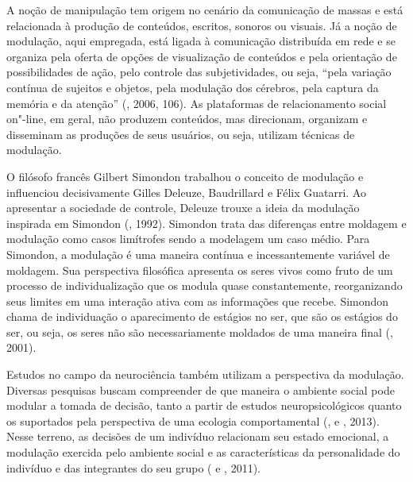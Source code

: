 A noção de manipulação tem origem no cenário da comunicação de massas e
está relacionada à produção de conteúdos, escritos, sonoros ou visuais.
Já a noção de modulação, aqui empregada, está ligada à comunicação
distribuída em rede e se organiza pela oferta de opções de visualização
de conteúdos e pela orientação de possibilidades de ação, pelo controle
das subjetividades, ou seja, ``pela variação contínua de sujeitos e
objetos, pela modulação dos cérebros, pela captura da memória e da
atenção'' (, 2006, 106). As plataformas de relacionamento
social on"-line, em geral, não produzem conteúdos, mas direcionam,
organizam e disseminam as produções de seus usuários, ou seja, utilizam
técnicas de modulação.

O filósofo francês Gilbert Simondon trabalhou o conceito de modulação e
influenciou decisivamente Gilles Deleuze, Baudrillard e Félix Guatarri.
Ao apresentar a sociedade de controle, Deleuze trouxe a ideia da
modulação inspirada em Simondon (, 1992). Simondon trata das
diferenças entre moldagem e modulação como casos limítrofes sendo a
modelagem um caso médio. Para Simondon, a modulação é uma maneira
contínua e incessantemente variável de moldagem. Sua perspectiva
filosófica apresenta os seres vivos como fruto de um processo de
individualização que os modula quase constantemente, reorganizando seus
limites em uma interação ativa com as informações que recebe. Simondon
chama de individuação o aparecimento de estágios no ser, que são os
estágios do ser, ou seja, os seres não são necessariamente moldados de
uma maneira final (, 2001).

Estudos no campo da neurociência também utilizam a perspectiva da
modulação. Diversas pesquisas buscam compreender de que maneira o
ambiente social pode modular a tomada de decisão, tanto a partir de
estudos neuropsicológicos quanto os suportados pela perspectiva de uma
ecologia comportamental (,  e , 2013). Nesse
terreno, as decisões de um indivíduo relacionam seu estado emocional, a
modulação exercida pelo ambiente social e as características da
personalidade do indivíduo e das integrantes do seu grupo ( e
, 2011).

